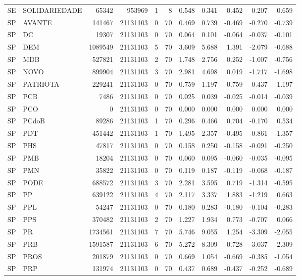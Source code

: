 \begin{landscape}
\begin{longtable}{llrrrrrrrrr}
SE & SOLIDARIEDADE & 65342 & 953969 & 1 & 8 & 0.548 & 0.341 & 0.452 & 0.207 & 0.659 \\
SP & AVANTE & 141467 & 21131103 & 0 & 70 & 0.469 & 0.739 & -0.469 & -0.270 & -0.739 \\
SP & DC & 19307 & 21131103 & 0 & 70 & 0.064 & 0.101 & -0.064 & -0.037 & -0.101 \\
SP & DEM & 1089549 & 21131103 & 5 & 70 & 3.609 & 5.688 & 1.391 & -2.079 & -0.688 \\
SP & MDB & 527821 & 21131103 & 2 & 70 & 1.748 & 2.756 & 0.252 & -1.007 & -0.756 \\
SP & NOVO & 899904 & 21131103 & 3 & 70 & 2.981 & 4.698 & 0.019 & -1.717 & -1.698 \\
SP & PATRIOTA & 229241 & 21131103 & 0 & 70 & 0.759 & 1.197 & -0.759 & -0.437 & -1.197 \\
SP & PCB & 7486 & 21131103 & 0 & 70 & 0.025 & 0.039 & -0.025 & -0.014 & -0.039 \\
SP & PCO & 0 & 21131103 & 0 & 70 & 0.000 & 0.000 & 0.000 & 0.000 & 0.000 \\
SP & PCdoB & 89286 & 21131103 & 1 & 70 & 0.296 & 0.466 & 0.704 & -0.170 & 0.534 \\
SP & PDT & 451442 & 21131103 & 1 & 70 & 1.495 & 2.357 & -0.495 & -0.861 & -1.357 \\
SP & PHS & 47817 & 21131103 & 0 & 70 & 0.158 & 0.250 & -0.158 & -0.091 & -0.250 \\
SP & PMB & 18204 & 21131103 & 0 & 70 & 0.060 & 0.095 & -0.060 & -0.035 & -0.095 \\
SP & PMN & 35822 & 21131103 & 0 & 70 & 0.119 & 0.187 & -0.119 & -0.068 & -0.187 \\
SP & PODE & 688572 & 21131103 & 3 & 70 & 2.281 & 3.595 & 0.719 & -1.314 & -0.595 \\
SP & PP & 639122 & 21131103 & 4 & 70 & 2.117 & 3.337 & 1.883 & -1.219 & 0.663 \\
SP & PPL & 54247 & 21131103 & 0 & 70 & 0.180 & 0.283 & -0.180 & -0.104 & -0.283 \\
SP & PPS & 370482 & 21131103 & 2 & 70 & 1.227 & 1.934 & 0.773 & -0.707 & 0.066 \\
SP & PR & 1734561 & 21131103 & 7 & 70 & 5.746 & 9.055 & 1.254 & -3.309 & -2.055 \\
SP & PRB & 1591587 & 21131103 & 6 & 70 & 5.272 & 8.309 & 0.728 & -3.037 & -2.309 \\
SP & PROS & 201879 & 21131103 & 0 & 70 & 0.669 & 1.054 & -0.669 & -0.385 & -1.054 \\
SP & PRP & 131974 & 21131103 & 0 & 70 & 0.437 & 0.689 & -0.437 & -0.252 & -0.689 \\

\end{longtable}
\end{landscape}
